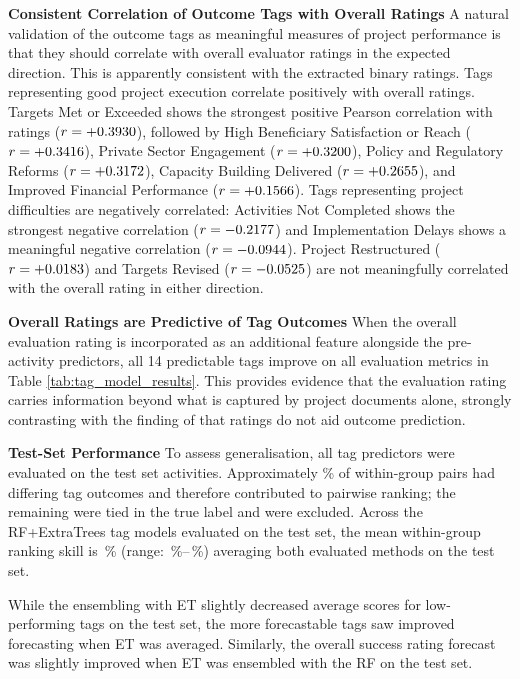 \documentclass[12pt,a4paper]{article}
\let\citep\parencite
\begin{document}
\textbf{Consistent Correlation of Outcome Tags with Overall Ratings} A natural validation of the outcome tags as meaningful measures of project performance is that they should correlate with overall evaluator ratings in the expected direction. This is apparently consistent with the extracted binary ratings. Tags representing good project execution correlate positively with overall ratings. Targets Met or Exceeded shows the strongest positive Pearson correlation with ratings ($r = +0.3930$), followed by High Beneficiary Satisfaction or Reach ($r = +0.3416$), Private Sector Engagement ($r = +0.3200$), Policy and Regulatory Reforms ($r = +0.3172$), Capacity Building Delivered ($r = +0.2655$), and Improved Financial Performance ($r = +0.1566$). Tags representing project difficulties are negatively correlated: Activities Not Completed shows the strongest negative correlation ($r = -0.2177$) and Implementation Delays shows a meaningful negative correlation ($r = -0.0944$). Project Restructured ($r = +0.0183$) and Targets Revised ($r = -0.0525$) are not meaningfully correlated with the overall rating in either direction. 

\textbf{Overall Ratings are Predictive of Tag Outcomes} When the overall evaluation rating is incorporated as an additional feature alongside the pre-activity predictors, all 14 predictable tags improve on all evaluation metrics in Table \ref{tab:tag_model_results}. This provides evidence that the evaluation rating carries information beyond what is captured by project documents alone, strongly contrasting with the finding of \citep{goldembergMindingGapAid2025} that ratings do not aid outcome prediction.


\textbf{Test-Set Performance} To assess generalisation, all tag predictors were evaluated on the test set activities. Approximately \DifferingOutcomePairsFrac\% of within-group pairs had differing tag outcomes and therefore contributed to pairwise ranking; the remaining were tied in the true label and were excluded. Across the \NumCuratedPredicted{} RF+ExtraTrees tag models evaluated on the test set, the mean within-group ranking skill is \OutcomeTagPairwiseAvg\,\% (range: \OutcomeTagPairwiseMin\,\%--\OutcomeTagPairwiseMax\,\%) averaging both evaluated methods on the test set.

While the ensembling with ET slightly decreased average scores for low-performing tags on the test set, the more forecastable tags saw improved forecasting when ET was averaged. Similarly, the overall success rating forecast was slightly improved when ET was ensembled with the RF on the test set.
\end{document}
